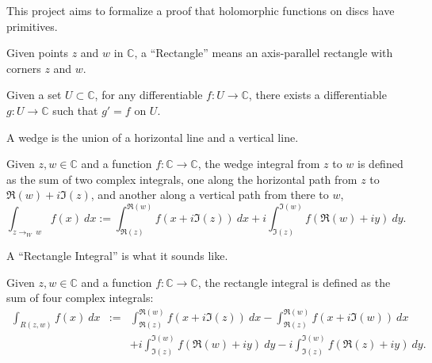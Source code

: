 
This project aims to formalize a proof that holomorphic functions on discs have primitives.


\begin{definition}[Rectangle]
  \label{Rectangle}
  \leanok
    Given points $z$ and $w$ in $\mathbb C$, a ``Rectangle'' means an axis-parallel rectangle with
    corners $z$ and $w$.
\end{definition}


\begin{definition}
  \label{HasPrimitives}
  \leanok
  Given a set $U\subset\mathbb C$, for any differentiable $f:U\to\mathbb C$, there exists a
  differentiable $g:U\to\mathbb C$ such that $g'=f$ on $U$.
\end{definition}


A wedge is the union of a horizontal line and a vertical line.

\begin{definition}
  \label{WedgeInt}
  \leanok
  Given $z,w\in\mathbb C$ and a function $f:\mathbb C\to\mathbb C$, the wedge integral from
  $z$ to $w$ is defined as the sum of two complex integrals, one along the horizontal path
  from $z$ to $\Re(w)+i \Im(z)$, and another along a vertical path from there to $w$,
   \begin{equation}
      \int_{z\to_W\  w} f(x)\ dx
      :=
      \int_{\Re(z)}^{\Re(w)} f(x+i\Im(z))\ dx
      +
      i\int_{\Im(z)}^{\Im(w)} f(\Re(w)+iy)\ dy
      .
   \end{equation}
\end{definition}


A ``Rectangle Integral'' is what it sounds like.

\begin{definition}
  \label{RectangleIntegral}
  \leanok
  Given $z,w\in\mathbb C$ and a function $f:\mathbb C\to\mathbb C$, the rectangle integral is
  defined as the sum of four complex integrals:
   \begin{eqnarray}
      \int_{R(z,w)} f(x)\ dx
      &:=&
      \int_{\Re(z)}^{\Re(w)} f(x+i\Im(z))\ dx
      -
      \int_{\Re(z)}^{\Re(w)} f(x+i\Im(w))\ dx
      \\
      &&+
      i\int_{\Im(z)}^{\Im(w)} f(\Re(w)+iy)\ dy
      -
      i\int_{\Im(z)}^{\Im(w)} f(\Re(z)+iy)\ dy
      .
   \end{eqnarray}
\end{definition}


